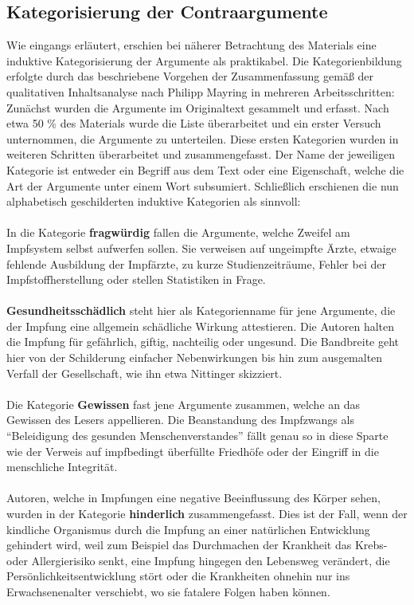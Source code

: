 \documentclass[
    a4paper,
    12pt,
    hyphens,
    chapterprefix=true,
    headheight=33pt,
    footheight=29pt,
    headings=optiontohead, %
]{scrartcl}
\begin{document}
\subsection{Kategorisierung der Contraargumente}
Wie eingangs erläutert, erschien bei näherer Betrachtung des Materials eine induktive Kategorisierung der Argumente als praktikabel. Die Kategorienbildung erfolgte durch das beschriebene Vorgehen der Zusammenfassung gemäß der qualitativen Inhaltsanalyse nach  Philipp Mayring in mehreren Arbeitsschritten: Zunächst wurden die Argumente im Originaltext gesammelt und erfasst. Nach etwa 50 \% des Materials wurde die Liste überarbeitet und ein erster Versuch unternommen, die Argumente zu unterteilen. Diese ersten Kategorien wurden in weiteren Schritten überarbeitet und zusammengefasst. Der Name der jeweiligen Kategorie ist entweder ein Begriff aus dem Text oder eine Eigenschaft, welche die Art der Argumente unter einem Wort subsumiert. Schließlich erschienen die nun alphabetisch geschilderten induktive Kategorien als sinnvoll:\\
\\
In die Kategorie \textbf{fragwürdig} fallen die Argumente, welche Zweifel am Impfsystem selbst aufwerfen sollen. Sie verweisen auf ungeimpfte Ärzte, etwaige fehlende Ausbildung der Impfärzte, zu kurze Studienzeiträume, Fehler bei der Impfstoffherstellung oder stellen Statistiken in Frage.\\ 
\\
\textbf{Gesundheitsschädlich} steht hier als Kategorienname für jene Argumente, die der Impfung eine allgemein schädliche Wirkung attestieren. Die Autoren halten die Impfung für gefährlich, giftig, nachteilig oder ungesund. Die Bandbreite geht hier von der Schilderung einfacher Nebenwirkungen bis hin zum ausgemalten Verfall der Gesellschaft, wie ihn etwa Nittinger skizziert.\\
\\
Die Kategorie \textbf{Gewissen} fast jene Argumente zusammen, welche an das Gewissen des Lesers appellieren. Die Beanstandung des Impfzwangs als "`Beleidigung des gesunden Menschenverstandes"' fällt genau so in diese Sparte wie der Verweis auf impfbedingt überfüllte Friedhöfe oder der Eingriff in die menschliche Integrität.\\
\\
Autoren, welche in Impfungen eine negative Beeinflussung des Körper sehen, wurden in der Kategorie \textbf{hinderlich} zusammengefasst. Dies ist der Fall, wenn der kindliche Organismus durch die Impfung an einer natürlichen Entwicklung gehindert wird, weil zum Beispiel das Durchmachen der Krankheit das Krebs- oder Allergierisiko senkt, eine Impfung hingegen den Lebensweg verändert, die Persönlichkeitsentwicklung stört oder die Krankheiten ohnehin nur ins Erwachsenenalter verschiebt, wo sie fatalere Folgen haben können.\\
\end{document}
